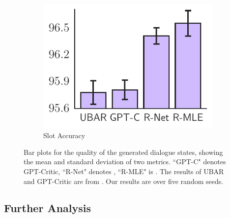 \begin{figure}[tb]
\begin{minipage}{0.49\textwidth}
\begin{subfigure}[b]{0.48\textwidth}
         \includegraphics[width=\textwidth]{./Tex/fig/slot_acc_bar.pdf}
         \captionsetup{font=small}
         \vspace{-6mm}
         \caption{Slot Accuracy}
         \label{fig:dst_slot_acc}
     \end{subfigure}
     \vspace{-3mm}
     \captionsetup{font=small}
        \caption{ 
       \footnotesize{ Bar plots for the quality of the generated dialogue states, showing the mean and standard deviation of two metrics.
        ``GPT-C" denotes GPT-Critic, ``R-Net" denotes \rewardnet, ``R-MLE" is \rewardmle.
        The results of UBAR and GPT-Critic are from \citet{gptcritic2022}.
        Our results are over five random seeds.}
        }
        \label{fig:further_dst}
    \end{minipage}
    \vspace{-1.2em}
\end{figure}




\vspace{-.5em}
\subsection{Further Analysis} \label{sec:exp_further}
\vspace{-.5em}

